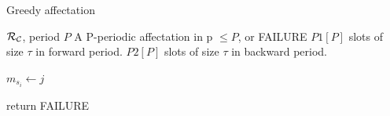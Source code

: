 \documentclass[a4paper,10pt]{article}
\begin{document}
	\begin{algorithm}[H]
	\caption{Greedy affectation}
	\begin{algorithmic}
	\REQUIRE ${\cal R}_{\cal C}$, period $P$
	\ENSURE A P-periodic affectation in p $\leq P$, or FAILURE
	\STATE $P1[P]$ slots of size $\tau$ in forward period.
	\STATE $P2[P]$ slots  of size $\tau$ in backward period.



	
	\STATE $m_{s_i} \leftarrow j$
	\ENDIF


	\STATE return FAILURE
	\ENDIF
	\ENDFOR

	\ENDFOR

	\end{algorithmic}
	\end{algorithm}

	
\end{document}
